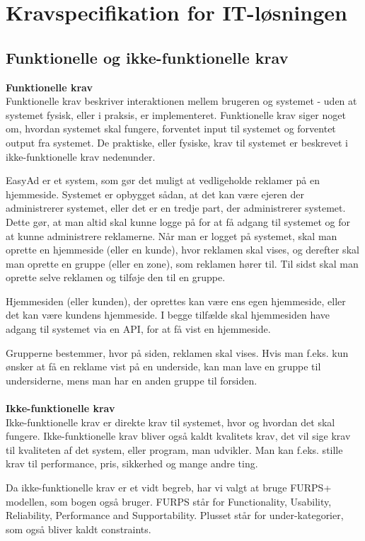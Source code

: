 \documentclass[a4paper,12pt]{article}
\begin{document}
\section{Kravspecifikation for IT-løsningen}
\subsection{Funktionelle og ikke-funktionelle krav}
\textbf{Funktionelle krav}
\\
Funktionelle krav beskriver interaktionen mellem brugeren og systemet - uden at systemet fysisk, eller i praksis, er implementeret. Funktionelle krav siger noget om, hvordan systemet skal fungere, forventet input til systemet og forventet output fra systemet. De praktiske, eller fysiske, krav til systemet er beskrevet i ikke-funktionelle krav nedenunder.

EasyAd er et system, som gør det muligt at vedligeholde reklamer på en hjemmeside. Systemet er opbygget sådan, at det kan være ejeren der administrerer systemet, eller det er en tredje part, der administrerer systemet. Dette gør, at man altid skal kunne logge på for at få adgang til systemet og for at kunne administrere reklamerne. Når man er logget på systemet, skal man oprette en hjemmeside (eller en kunde), hvor reklamen skal vises, og derefter skal man oprette en gruppe (eller en zone), som reklamen hører til. Til sidst skal man oprette selve reklamen og tilføje den til en gruppe.

Hjemmesiden (eller kunden), der oprettes kan være ens egen hjemmeside, eller det kan være kundens hjemmeside. I begge tilfælde skal hjemmesiden have adgang til systemet via en API, for at få vist en hjemmeside.

Grupperne bestemmer, hvor på siden, reklamen skal vises. Hvis man f.eks. kun ønsker at få en reklame vist på en underside, kan man lave en gruppe til undersiderne, mens man har en anden gruppe til forsiden.
\\
\\
\textbf{Ikke-funktionelle krav}
\\
Ikke-funktionelle krav er direkte krav til systemet, hvor og hvordan det skal fungere. Ikke-funktionelle krav bliver også kaldt kvalitets krav, det vil sige krav til kvaliteten af det system, eller program, man udvikler. Man kan f.eks. stille krav til performance, pris, sikkerhed og mange andre ting. 

Da ikke-funktionelle krav er et vidt begreb, har vi valgt at bruge FURPS+ modellen, som bogen også bruger. FURPS står for Functionality, Usability, Reliability, Performance and Supportability. Plusset står for under-kategorier, som også bliver kaldt constraints.
\end{document}
